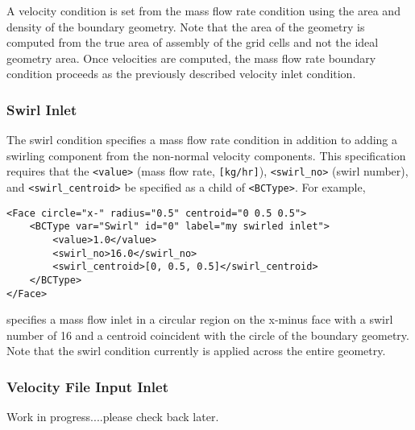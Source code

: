 A velocity condition is set from the mass flow rate condition using the area and density of the boundary geometry.  Note that the area of the geometry is computed from the true area of assembly of the grid cells and not the ideal geometry area.  Once velocities are computed, the mass flow rate boundary condition proceeds as the previously described velocity inlet condition.  

\subsubsection*{Swirl Inlet}
% 
The swirl condition specifies a mass flow rate condition in addition to adding a swirling component from the non-normal velocity components.  This specification requires that the \verb=<value>= (mass flow rate, \verb=[kg/hr]=), \verb=<swirl_no>= (swirl number), and \verb=<swirl_centroid>= be specified as a child of \verb=<BCType>=.  For example, 
%
\begin{Verbatim}[fontsize=\footnotesize]
<Face circle="x-" radius="0.5" centroid="0 0.5 0.5">
	<BCType var="Swirl" id="0" label="my swirled inlet">
		<value>1.0</value>
		<swirl_no>16.0</swirl_no>
		<swirl_centroid>[0, 0.5, 0.5]</swirl_centroid>
	</BCType>
</Face>
\end{Verbatim}
%
specifies a mass flow inlet in a circular region on the x-minus face with a swirl number of 16 and a centroid coincident with the circle of the boundary geometry.  Note that the swirl condition currently is applied across the entire geometry. 
%

\subsubsection*{Velocity File Input Inlet}
% 
Work in progress....please check back later. 


